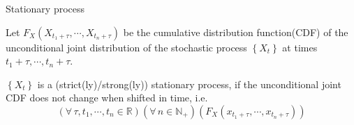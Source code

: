 \documentclass[utf-8, 10pt, aspectratio=1610]{beamer}
\begin{document}
\begin{frame}[allowframebreaks]{Stationary process}
	\vspace*{\fill}

	\begin{definition}
		\par Let \(F_X\left(X_{t_1+\tau},\cdots,X_{t_n+\tau}\right)\) be the cumulative distribution function(CDF) of the unconditional joint distribution of the stochastic process \(\left\{X_t\right\}\) at times \(t_1+\tau,\cdots,t_n+\tau\).
		\par \(\left\{X_t\right\}\) is a (strict(ly)/strong(ly)) stationary process, if the unconditional joint CDF does not change when shifted in time, i.e.
		\begin{equation}
			\left(\forall\, \tau,t_1,\cdots,t_n\in \mathbb{R}\right)\left(\forall\,n\in \mathbb{N}_{+}\right)\left(F_X\left(x_{t_1+\tau},\cdots,x_{t_n+\tau}\right)\right)
		\end{equation}
	\end{definition}

	\vspace*{\fill}

	\framebreak
	\vspace*{\fill}


\end{frame}
\end{document}

